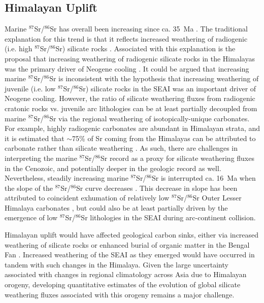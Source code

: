 \documentclass[9pt,twocolumn,twoside,lineno]{pnas-new}
\newcommand{\SrSr}{$^{87}$Sr/$^{86}$Sr\xspace}
\begin{document}
\subsection*{Himalayan Uplift}

Marine \SrSr has overall been increasing since ca. 35~Ma \cite{McArthur2012a}. The traditional explanation for this trend is that it reflects increased weathering of radiogenic (i.e. high \SrSr) silicate rocks \cite{Raymo1988a}. Associated with this explanation is the proposal that increasing weathering of radiogenic silicate rocks in the Himalayas was the primary driver of Neogene cooling \cite{Raymo1992a}. It could be argued that increasing marine \SrSr is inconsistent with the hypothesis that increasing weathering of juvenile (i.e. low \SrSr) silicate rocks in the SEAI was an important driver of Neogene cooling. However, the ratio of silicate weathering fluxes from radiogenic cratonic rocks vs. juvenile arc lithologies can be at least partially decoupled from marine \SrSr via the regional weathering of isotopically-unique carbonates. For example, highly radiogenic carbonates are abundant in Himalayan strata, and it is estimated that $\sim$75\% of Sr coming from the Himalayas can be attributed to carbonate rather than silicate weathering \cite{Jacobson2002a, Quade2003a, Oliver2003a}. As such, there are challenges in interpreting the marine \SrSr record as a proxy for silicate weathering fluxes in the Cenozoic, and potentially deeper in the geologic record as well. Nevertheless, steadily increasing marine \SrSr is interrupted ca. 16~Ma when the slope of the \SrSr curve decreases \cite{McArthur2012a}. This decrease in slope has been attributed to coincident exhumation of relatively low \SrSr Outer Lesser Himalaya carbonates \cite{Myrow2015a, Colleps2018a}, but could also be at least partially driven by the emergence of low \SrSr lithologies in the SEAI during arc-continent collision.

Himalayan uplift would have affected geological carbon sinks, either via increased weathering of silicate rocks \cite{Raymo1992a} or enhanced burial of organic matter in the Bengal Fan \cite{Galy2007a}. Increased weathering of the SEAI as they emerged would have occurred in tandem with such changes in the Himalaya. Given the large uncertainty associated with changes in regional climatology across Asia due to Himalayan orogeny, developing quantitative estimates of the evolution of global silicate weathering fluxes associated with this orogeny remains a major challenge.
\end{document}
